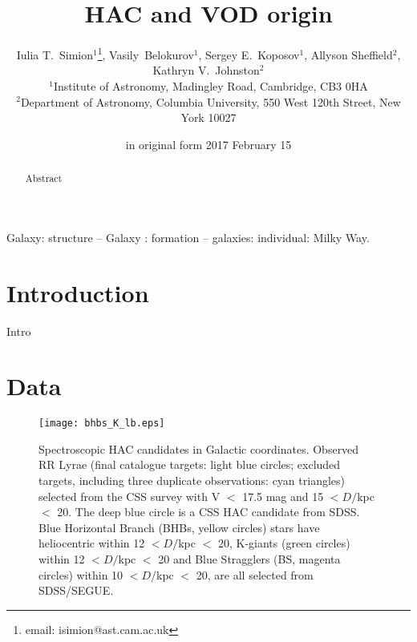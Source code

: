 \documentclass[useAMS,usenatbib]{mn2e}
\title[MDM]
  {HAC and VOD origin}
\author[I.T. Simion et al.]
  {Iulia T.~Simion$^1$\thanks{email: isimion@ast.cam.ac.uk}, Vasily~Belokurov$^1$, Sergey E.~Koposov$^{1}$,   Allyson Sheffield$^2$,
  \newauthor
  Kathryn V.~Johnston$^2$
\\ $^{1}$Institute of Astronomy, Madingley Road, Cambridge, CB3 0HA
\\ $^{2}$Department of Astronomy, Columbia University, 550 West 120th Street, New York 10027
}
\date{in original form 2017 February 15}
\begin{document}
\label{firstpage}

\maketitle

\begin{abstract}
Abstract
\end{abstract}
 \begin{keywords}
Galaxy: structure -- Galaxy : formation -- galaxies: individual: Milky
Way.
\end{keywords}
%
%
\section{Introduction}
Intro
\section{Data}

\begin{figure}
\hspace{-0.5cm}
\texttt{[image: bhbs\_K\_lb.eps]}
\caption{Spectroscopic HAC candidates in Galactic coordinates. Observed RR Lyrae (final catalogue targets: light blue circles; excluded targets, including three duplicate observations: cyan triangles) selected from the CSS survey with V $< $ 17.5 mag and 15 $ <  D/$kpc $ <$ 20. The deep blue circle is a CSS HAC candidate from SDSS. Blue Horizontal Branch (BHBs, yellow circles) stars have heliocentric within 12 $ < D/$kpc $ <$ 20, K-giants (green circles) within 12 $ < D/$kpc $ <$ 20 and Blue Stragglers (BS, magenta circles) within 10 $ <  D/$kpc $ <$ 20, are all selected from SDSS/SEGUE.}
\label{lb}
\end{figure}


%
\end{document}
